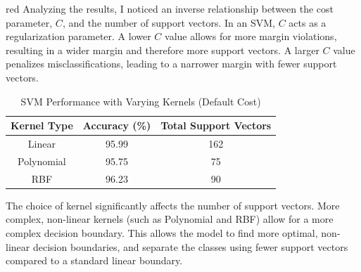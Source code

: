 \documentclass[11pt]{article}
\begin{document}
\begin{enumerate}
\begin{enumerate}
\begin{color}{red}
Analyzing the results, I noticed an inverse relationship between the cost parameter, $C$, and the number of support vectors. In an SVM, $C$ acts as a regularization parameter. A lower $C$ value allows for more margin violations, resulting in a wider margin and therefore more support vectors. A larger $C$ value penalizes misclassifications, leading to a narrower margin with fewer support vectors.

\begin{table}[h]
\centering
\begin{tabular}{|c|c|c|}
\hline
\textbf{Kernel Type} & \textbf{Accuracy (\%)} & \textbf{Total Support Vectors} \\ \hline
Linear     & 95.99 & 162 \\ \hline
Polynomial & 95.75 & 75  \\ \hline
RBF        & 96.23 & 90  \\ \hline
\end{tabular}
\caption{SVM Performance with Varying Kernels (Default Cost)}
\end{table}

The choice of kernel significantly affects the number of support vectors. More complex, non-linear kernels (such as Polynomial and RBF) allow for a more complex decision boundary. This allows the model to find more optimal, non-linear decision boundaries, and separate the classes using fewer support vectors compared to a standard linear boundary.


\end{color}

\end{enumerate}
\end{enumerate}
\end{document}
